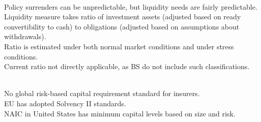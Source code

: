 \begin{remark} \\
Policy surrenders can be unpredictable, but liquidity needs are fairly predictable.\\
Liquidity measure takes ratio of investment assets (adjusted based on ready convertibility to cash) to obligations (adjusted based on assumptions about withdrawals).\\
Ratio is estimated under both normal market conditions and under stress conditions.\\
Current ratio not directly applicable, as BS do not include such classifications.
\end{remark}

\begin{remark} \\
No global risk-based capital requirement standard for insurers.\\
EU has adopted Solvency II standards.\\
NAIC in United States has minimum capital levels based on size and risk.
\end{remark}
